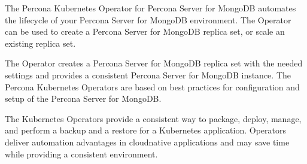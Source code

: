 \documentclass[letterpaper,10pt,english]{sphinxmanual}
\begin{document}
The Percona Kubernetes Operator for Percona Server for MongoDB automates the lifecycle of your Percona Server for MongoDB environment. The Operator can be used to create a Percona Server for MongoDB replica set, or scale an existing replica set.

The Operator creates a Percona Server for MongoDB replica set with the needed settings and provides a consistent Percona Server for MongoDB instance. The Percona Kubernetes Operators are based on best practices for configuration and setup of the Percona Server for MongoDB.

The Kubernetes Operators provide a consistent way to package, deploy, manage, and perform a backup and a restore for a Kubernetes application. Operators deliver automation advantages in cloud\sphinxhyphen{}native applications and may save time while providing a consistent environment.
\end{document}
